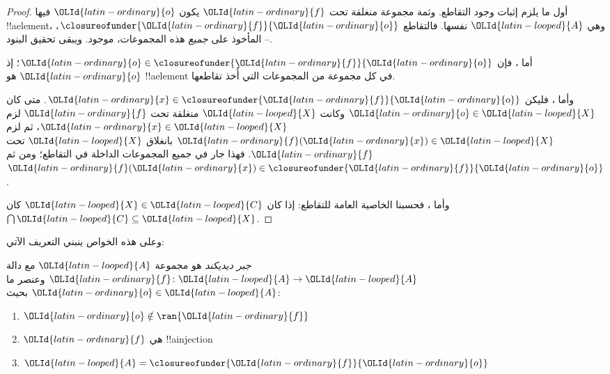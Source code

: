 \documentclass[../../../include/open-logic-section]{subfiles}
\begin{document}
\begin{proof}
أول ما يلزم إثبات وجود التقاطع. وثمة مجموعة منغلقة تحت ${\OLId{latin-ordinary}{f}}$ يكون ${\OLId{latin-ordinary}{o}}$ فيها
!!a{element}، وهي ${\OLId{latin-looped}{A}}$ نفسها. فالتقاطع $\closureofunder{{\OLId{latin-ordinary}{f}}}{{\OLId{latin-ordinary}{o}}}$، المأخوذ على
\emph{جميع} هذه المجموعات، موجود. ويبقى تحقيق البنود
--.

أما ، فإن ${\OLId{latin-ordinary}{o}} \in
\closureofunder{{\OLId{latin-ordinary}{f}}}{{\OLId{latin-ordinary}{o}}}$؛ إذ ${\OLId{latin-ordinary}{o}}$ هو !!a{element} في كل مجموعة من المجموعات التي أُخذ تقاطعها.

وأما ، فليكن ${\OLId{latin-ordinary}{x}} \in
\closureofunder{{\OLId{latin-ordinary}{f}}}{{\OLId{latin-ordinary}{o}}}$. متى كان ${\OLId{latin-ordinary}{o}} \in {\OLId{latin-looped}{X}}$ وكانت ${\OLId{latin-looped}{X}}$ منغلقة تحت ${\OLId{latin-ordinary}{f}}$ لزم ${\OLId{latin-ordinary}{x}} \in {\OLId{latin-looped}{X}}$، ثم لزم ${\OLId{latin-ordinary}{f}}({\OLId{latin-ordinary}{x}}) \in {\OLId{latin-looped}{X}}$ بانغلاق ${\OLId{latin-looped}{X}}$ تحت ${\OLId{latin-ordinary}{f}}$.
فهذا جار في جميع المجموعات الداخلة في التقاطع؛ ومن ثم ${\OLId{latin-ordinary}{f}}({\OLId{latin-ordinary}{x}}) \in \closureofunder{{\OLId{latin-ordinary}{f}}}{{\OLId{latin-ordinary}{o}}}$.

وأما ، فحسبنا الخاصية العامة للتقاطع: إذا كان ${\OLId{latin-looped}{X}}
\in {\OLId{latin-looped}{C}}$ كان $\bigcap {\OLId{latin-looped}{C}} \subseteq {\OLId{latin-looped}{X}}$.
\end{proof}

وعلى هذه الخواص ينبني التعريف الآتي:

\begin{defn}
\emph{جبر ديديكند} هو مجموعة ${\OLId{latin-looped}{A}}$ مع دالة ${\OLId{latin-ordinary}{f}}
\colon {\OLId{latin-looped}{A}} \to {\OLId{latin-looped}{A}}$ وعنصر ما ${\OLId{latin-ordinary}{o}} \in {\OLId{latin-looped}{A}}$ بحيث:
	\begin{enumerate}
		\item {} ${\OLId{latin-ordinary}{o}} \notin \ran{{\OLId{latin-ordinary}{f}}}$
		\item {} ${\OLId{latin-ordinary}{f}}$ هي !!a{injection}
		\item {} ${\OLId{latin-looped}{A}} = \closureofunder{{\OLId{latin-ordinary}{f}}}{{\OLId{latin-ordinary}{o}}}$
	\end{enumerate}
\end{defn}
\end{document}

